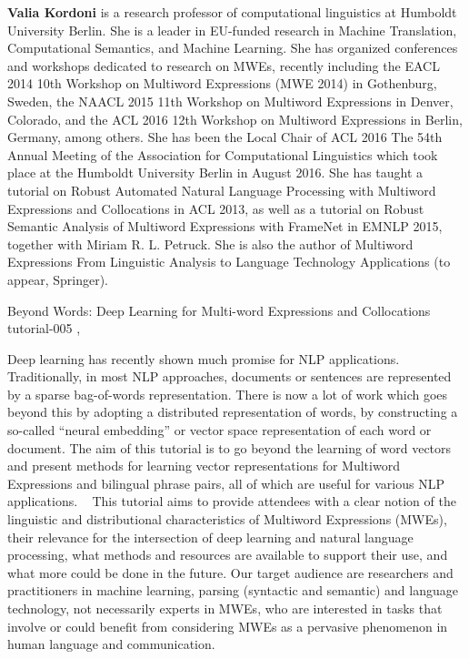 \begin{bio}
  {\bfseries Valia Kordoni} is a research professor of computational linguistics at Humboldt University Berlin. She is a leader in EU-funded research in Machine Translation, Computational Semantics, and Machine Learning. She has organized conferences and workshops dedicated to research on MWEs, recently including the EACL 2014 10th Workshop on Multiword Expressions (MWE 2014) in Gothenburg, Sweden, the NAACL 2015 11th Workshop on Multiword Expressions in Denver, Colorado, and the ACL 2016 12th Workshop on Multiword Expressions in Berlin, Germany, among others. She has been the Local Chair of ACL 2016 The 54th Annual Meeting of the Association for Computational Linguistics which took place at the Humboldt University Berlin in August 2016. She has taught a tutorial on Robust Automated Natural Language Processing with Multiword Expressions and Collocations in ACL 2013, as well as a tutorial on Robust Semantic Analysis of Multiword Expressions with FrameNet in EMNLP 2015, together with Miriam R. L. Petruck. She is also the author of Multiword Expressions From Linguistic Analysis to Language Technology Applications (to appear, Springer).
\end{bio}

\begin{tutorial}
  {Beyond Words: Deep Learning for Multi-word Expressions and Collocations}
  {tutorial-005}
  {\daydateyear, \tutorialafternoontime}
  {\TutLocE}

Deep learning has recently shown much promise for NLP applications. Traditionally, in most NLP approaches, documents or sentences are represented by a sparse bag-of-words representation. There is now a lot of work which goes beyond this by adopting a distributed representation of words, by constructing a so-called ``neural embedding'' or vector space representation of each word or document. The aim of this tutorial is to go beyond the learning of word vectors and present methods for learning vector representations for Multiword Expressions and bilingual phrase pairs, all of which are useful for various NLP applications.
 
This tutorial aims to provide attendees with a clear notion of the linguistic and distributional characteristics of Multiword Expressions (MWEs), their relevance for the intersection of deep learning and natural language processing, what methods and resources are available to support their use, and what more could be done in the future. Our target audience are researchers and practitioners in machine learning, parsing (syntactic and semantic) and language technology, not necessarily experts in MWEs, who are interested in tasks that involve or could benefit from considering MWEs as a pervasive phenomenon in human language and communication.
\end{tutorial}
